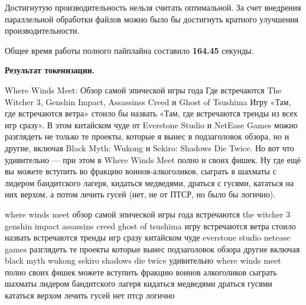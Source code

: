 Достигнутую производительность нельзя считать оптимальной. За счет внедрения параллельной обработки файлов можно было бы достигнуть кратного улучшения производительности.

Общее время работы полного пайплайна составило \textbf{164.45} секунды.

\vspace{2em}
\noindent\textbf{Результат токенизации.}
\begin{tcolorbox}[colback=blue!5!white,colframe=blue!75!black]
Where Winds Meet: Обзор самой эпической игры года Где встречаются The Witcher 3, Genshin Impact, Assassinss Creed и Ghost of Tsushima Игру «Там, где встречаются ветра» стоило бы назвать «Там, где встречаются тренды из всех игр сразу». В этом китайском чуде от Everstone Studio и NetEase Games можно разглядеть не только те проекты, которые я вынес в подзаголовок обзора, но и другие, включая Black Myth: Wukong и Sekiro: Shadows Die Twice. Но вот что удивительно — при этом в Where Winds Meet полно и своих фишек. Ну где ещё вы можете вступить во фракцию воинов-алкоголиков, сыграть в шахматы с лидером бандитского лагеря, кидаться медведями, драться с гусями, кататься на них верхом, а потом лечить гусей (нет, не от ПТСР, но было бы логично).
\end{tcolorbox}

\bigskip

\begin{tcolorbox}[colback=green!5!white,colframe=green!75!black]
where winds meet обзор самой эпической игры года встречаются the witcher 3 genshin impact assassins creed ghost of tsushima игру встречаются ветра стоило назвать встречаются тренды игр сразу китайском чуде everstone studio netease games разглядеть те проекты которые вынес подзаголовок обзора другие включая black myth wukong sekiro shadows die twice удивительно where winds meet полно своих фишек можете вступить фракцию воинов алкоголиков сыграть шахматы лидером бандитского лагеря кидаться медведями драться гусями кататься верхом лечить гусей нет птср логично
\end{tcolorbox}

\pagebreak

